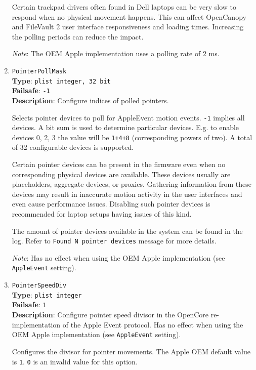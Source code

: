 \documentclass[]{article}
\begin{document}
\begin{enumerate}
  Certain trackpad drivers often found in Dell laptops can be very slow
  to respond when no physical movement happens. This can affect
  OpenCanopy and FileVault 2 user interface responsiveness and loading times.
  Increasing the polling periods can reduce the impact.

  \emph{Note}: The OEM Apple implementation uses a polling rate of 2 ms.

  \item
  \texttt{PointerPollMask}\\
  \textbf{Type}: \texttt{plist\ integer, 32 bit}\\
  \textbf{Failsafe}: \texttt{-1}\\
  \textbf{Description}: Configure indices of polled pointers.

  Selects pointer devices to poll for AppleEvent motion events.
  \texttt{-1} implies all devices. A bit sum is used to determine
  particular devices. E.g. to enable devices 0, 2, 3 the value
  will be \texttt{1+4+8} (corresponding powers of two). A total
  of 32 configurable devices is supported.

  Certain pointer devices can be present in the firmware even when
  no corresponding physical devices are available. These devices
  usually are placeholders, aggregate devices, or proxies.
  Gathering information from these devices may result in inaccurate
  motion activity in the user interfaces and even cause performance
  issues. Disabling such pointer devices is recommended for laptop
  setups having issues of this kind.

  The amount of pointer devices available in the system can be
  found in the log. Refer to \texttt{Found N pointer devices} message
  for more details.

  \emph{Note}: Has no effect when using the OEM Apple implementation
  (see \texttt{AppleEvent} setting).

  \item
  \texttt{PointerSpeedDiv}\\
  \textbf{Type}: \texttt{plist\ integer}\\
  \textbf{Failsafe}: \texttt{1}\\
  \textbf{Description}: Configure pointer speed divisor in the OpenCore re-implementation
  of the Apple Event protocol.
  Has no effect when using the OEM Apple implementation (see \texttt{AppleEvent} setting).

  Configures the divisor for pointer movements. The Apple OEM default value is \texttt{1}.
  \texttt{0} is an invalid value for this option.


\end{enumerate}
\end{document}
